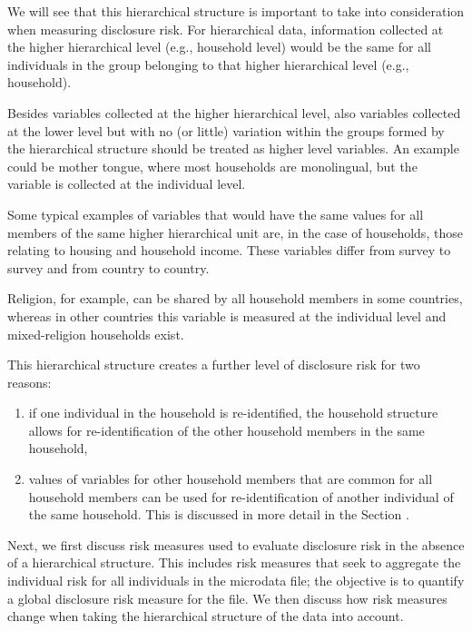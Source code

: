 \documentclass[letterpaper,10pt,english]{sphinxmanual}
\begin{document}
We will see that this hierarchical structure is important to take into
consideration when measuring disclosure risk. For hierarchical data,
information collected at the higher hierarchical level (e.g., household
level) would be the same for all individuals in the group belonging to
that higher hierarchical level (e.g., household). %
\begin{footnote}[3]\sphinxAtStartFootnote
Besides variables collected at the higher hierarchical level, also
variables collected at the lower level but with no (or little)
variation within the groups formed by the hierarchical structure
should be treated as higher level variables. An example could be
mother tongue, where most households are monolingual, but the
variable is collected at the individual level.
%
\end{footnote}
Some typical examples of variables that would have the same values for
all members of the same higher hierarchical unit are, in the case of
households, those relating to housing and household income. These
variables differ from survey to survey and from country to
country. %
\begin{footnote}[4]\sphinxAtStartFootnote
Religion, for example, can be shared by all household members in
some countries, whereas in other countries this variable is measured
at the individual level and mixed-religion households exist.
%
\end{footnote} This hierarchical structure creates a
further level of disclosure risk for two reasons:
\begin{enumerate}
\item {} 
if one individual in the household is re-identified, the household structure allows for
re-identification of the other household members in the same household,

\item {} 
values of variables for other household members that are common for
all household members can be used for re-identification of another
individual of the same household. This is discussed in more detail in
the Section {\hyperref[\detokenize{measure_risk:household-risk}]{}}.

\end{enumerate}

Next, we first discuss risk measures used to evaluate
disclosure risk in the absence of a hierarchical structure. This
includes risk measures that seek to aggregate the individual risk for
all individuals in the microdata file; the objective is to quantify a
global disclosure risk measure for the file. We then discuss how risk
measures change when taking the hierarchical structure of the data into
account.
\end{document}
